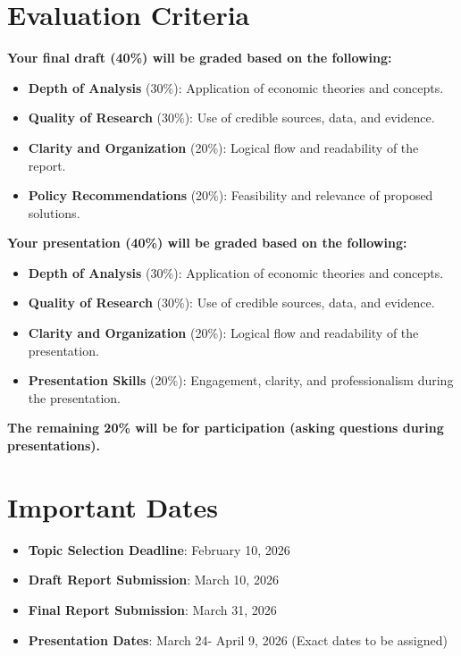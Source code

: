 \documentclass[12pt]{article}
\begin{document}
\section*{Evaluation Criteria}
\textbf{Your final draft (40\%) will be graded based on the following:}
\begin{itemize}
    \item \textbf{Depth of Analysis} (30\%): Application of economic theories and concepts.
    \item \textbf{Quality of Research} (30\%): Use of credible sources, data, and evidence.
    \item \textbf{Clarity and Organization} (20\%): Logical flow and readability of the report.
    \item \textbf{Policy Recommendations} (20\%): Feasibility and relevance of proposed solutions.
\end{itemize}
\vspace{1cm}
\textbf{Your presentation (40\%) will be graded based on the following:}
\begin{itemize}
    \item \textbf{Depth of Analysis} (30\%): Application of economic theories and concepts.
    \item \textbf{Quality of Research} (30\%): Use of credible sources, data, and evidence.
    \item \textbf{Clarity and Organization} (20\%): Logical flow and readability of the presentation.

    \item \textbf{Presentation Skills} (20\%): Engagement, clarity, and professionalism during the presentation.
\end{itemize}
\vspace{0.5cm}
\textbf{The remaining 20\% will be for participation (asking questions during presentations).}
\section*{Important Dates}
\begin{itemize}
    \item \textbf{Topic Selection Deadline}: February 10, 2026

    \item \textbf{Draft Report Submission}: March 10, 2026 
    \item \textbf{Final Report Submission}: March 31, 2026
    \item \textbf{Presentation Dates}: March 24- April 9, 2026 (Exact dates to be assigned)
\end{itemize}
\end{document}
